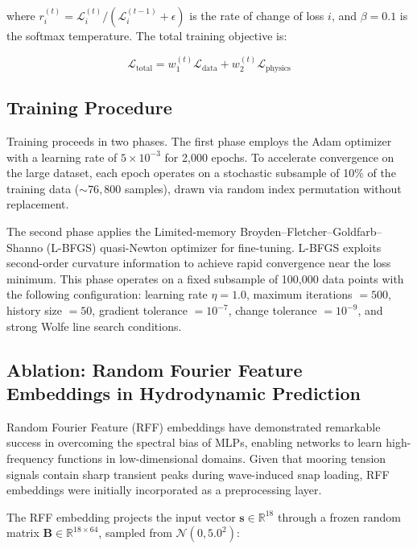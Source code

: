 \documentclass[preprint,12pt]{elsarticle}
\begin{document}
\noindent where $r_i^{(t)} = \mathcal{L}_i^{(t)} / (\mathcal{L}_i^{(t-1)} + \epsilon)$ is the rate of change of loss $i$, and $\beta = 0.1$ is the softmax temperature. The total training objective is:

\begin{equation}
\label{eq:total_loss}
    \mathcal{L}_{\text{total}} = w_1^{(t)} \mathcal{L}_{\text{data}} + w_2^{(t)} \mathcal{L}_{\text{physics}}
\end{equation}

\subsection{Training Procedure}
\label{sec:training}

Training proceeds in two phases. The first phase employs the Adam optimizer \cite{kingma2015adam} with a learning rate of $5 \times 10^{-3}$ for 2,000 epochs. To accelerate convergence on the large dataset, each epoch operates on a stochastic subsample of 10\% of the training data (${\sim}76{,}800$ samples), drawn via random index permutation without replacement.

The second phase applies the Limited-memory Broyden--Fletcher--Goldfarb--Shanno (L-BFGS) quasi-Newton optimizer \cite{liu1989limited} for fine-tuning. L-BFGS exploits second-order curvature information to achieve rapid convergence near the loss minimum. This phase operates on a fixed subsample of 100,000 data points with the following configuration: learning rate $\eta = 1.0$, maximum iterations $= 500$, history size $= 50$, gradient tolerance $= 10^{-7}$, change tolerance $= 10^{-9}$, and strong Wolfe line search conditions.

\subsection{Ablation: Random Fourier Feature Embeddings in Hydrodynamic Prediction}
\label{sec:ablation}

Random Fourier Feature (RFF) embeddings \cite{tancik2020fourier} have demonstrated remarkable success in overcoming the spectral bias of MLPs, enabling networks to learn high-frequency functions in low-dimensional domains. Given that mooring tension signals contain sharp transient peaks during wave-induced snap loading, RFF embeddings were initially incorporated as a preprocessing layer.

The RFF embedding projects the input vector $\mathbf{s} \in \mathbb{R}^{18}$ through a frozen random matrix $\mathbf{B} \in \mathbb{R}^{18 \times 64}$, sampled from $\mathcal{N}(0, 5.0^2)$:
\end{document}
